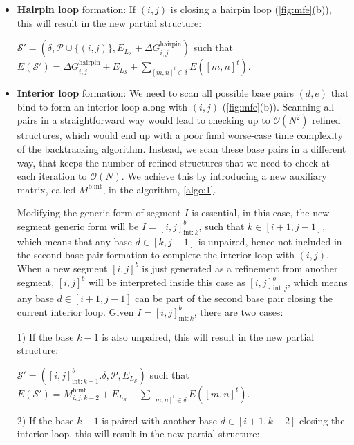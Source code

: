 \begin{enumerate}
	\begin{itemize}
		
		\item \textbf{Hairpin loop} formation: If  $(i,j)$ is closing a hairpin loop (\cref{fig:mfe}(b)), this will result in the new partial structure:
		
		$\mathcal{S}' = (\delta, \mathcal{P} \cup \{(i,j)\}, E_{L_{\mathcal{S}}} + \Delta G_{i,j}^\text{hairpin} )$ such that $E(\mathcal{S}') = \Delta G_{i,j}^\text{hairpin} + E_{L_{\mathcal{S}}} 
		+ \sum \limits_{[m,n]^t \in \delta} E([m,n]^t)$. 
		
		
		\item \textbf{Interior loop} formation: We need to scan all possible base pairs $(d,e)$ that bind to form an interior loop along with $(i,j)$ (\cref{fig:mfe}(b)). 
		Scanning all pairs in a straightforward way would lead to checking up to $\mathcal{O}(N^2)$ refined structures, 
		which would end up with a poor final worse-case time complexity of the backtracking algorithm. 
		Instead, we scan these base pairs in a different way, that keeps the number of refined structures that we need to check at each iteration to $\mathcal{O}(N)$. We achieve this by introducing a new auxiliary matrix, called $M^\text{b:int}$, in the \snMFE algorithm,  \cref{algo:1}. 		
		
		Modifying the generic form of segment $I$ is essential, in this case, the new segment generic form will be $I = [i,j]^b_{\text{int}:k}$, such that $k \in [i+1,j-1]$, which means that any base $d \in[k,j-1]$ is unpaired, hence not included in the second base pair formation to complete the interior loop with $(i,j)$.
		When a new segment $[i,j]^b$ is just generated as a refinement from another segment, 
		$[i,j]^b$ will be interpreted inside this case as $ [i,j]^b_{\text{int}:j} $, which means any base $d \in [i+1,j-1]$ can be part of the second base pair closing the current interior loop. 
		Given  $I = [i,j]^b_{\text{int}:k}$, there are two cases:
		
		1) If the base $k-1$ is also unpaired, this will
		result in the new partial structure: 
		
		$\mathcal{S}' = ([i,j]^b_{\text{int}:k-1}.\delta, \mathcal{P}, E_{L_{\mathcal{S}}})$ such that $E(\mathcal{S}') = M_{i,j,k-2}^\text{b:int} + E_{L_{\mathcal{S}}} 
		+ \sum \limits_{[m,n]^t \in \delta} E([m,n]^t)$.
		
		2) If the base $k-1$ is paired with another base $d \in [i+1,k-2]$ closing the interior loop, this will result in the new partial structure: 
		

\end{itemize}
\end{enumerate}
